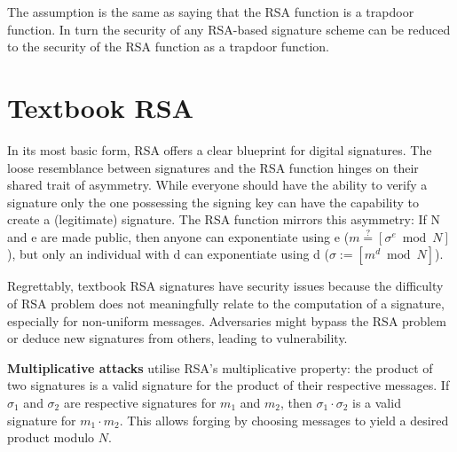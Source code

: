 \documentclass[]{final_report}
\theoremstyle{definition}
\begin{document}
The assumption is the same as saying that the RSA function is a trapdoor function. In turn the security of any RSA-based signature scheme can be reduced to the security of the RSA function as a trapdoor function.


\section{Textbook RSA}
In its most basic form, RSA offers a clear blueprint for digital signatures. The loose resemblance between signatures and the RSA function hinges on their shared trait of asymmetry. While everyone should have the ability to verify a signature only the one possessing the signing key can have the capability to create a (legitimate) signature. The RSA function mirrors this asymmetry: If N and e are made public, then anyone can exponentiate using e ($m \stackrel{?}{=} [\sigma^e \bmod N]$), but only an individual with d can exponentiate using d ($\sigma := [m^d \bmod N]$). 

Regrettably, textbook RSA signatures have security issues because the difficulty of RSA problem does not meaningfully relate to the computation of a signature, especially for non-uniform messages. Adversaries might bypass the RSA problem or deduce new signatures from others, leading to vulnerability.

\textbf{Multiplicative attacks} utilise RSA's multiplicative property: the product of two signatures is a valid signature for the product of their respective messages. If \( \sigma_{1} \) and \( \sigma_{2} \) are respective signatures for \( m_{1} \) and \( m_{2} \), then \( \sigma_{1} \cdot \sigma_{2} \) is a valid signature for \( m_{1} \cdot m_{2} \). This allows forging by choosing messages to yield a desired product modulo \( N \).

\end{document}
